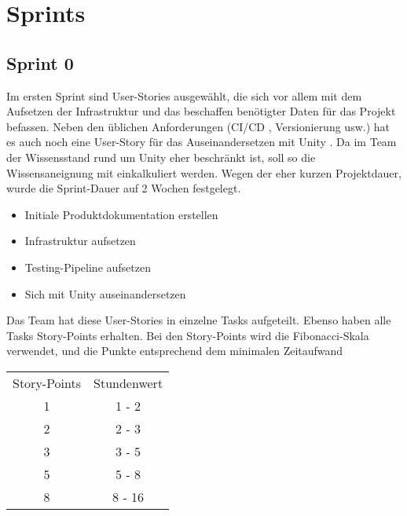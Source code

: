 \documentclass[../main.tex]{subfiles}
\begin{document}
	\section{Sprints}
	\label{section:Sprint 0}
	\subsection{Sprint 0}
	
	\par Im ersten Sprint sind User-Stories  ausgewählt, die sich vor allem mit dem Aufsetzen der Infrastruktur und das beschaffen benötigter Daten für das Projekt befassen. Neben den üblichen Anforderungen (CI/CD , Versionierung  usw.) hat es auch noch eine User-Story für das Auseinandersetzen mit Unity . Da im Team der Wissensstand rund um Unity eher beschränkt ist, soll so die Wissensaneignung mit einkalkuliert werden. Wegen der eher kurzen Projektdauer, wurde die Sprint-Dauer auf 2 Wochen festgelegt.
	
	\begin{itemize}
		\item Initiale Produktdokumentation erstellen
		\item Infrastruktur aufsetzen
		\item Testing-Pipeline aufsetzen
		\item Sich mit Unity auseinandersetzen
	\end{itemize} 

	\par Das Team hat diese User-Stories in einzelne Tasks aufgeteilt. Ebenso haben alle Tasks Story-Points erhalten. Bei den Story-Points wird die Fibonacci-Skala verwendet, und die Punkte entsprechend dem minimalen Zeitaufwand
	
	\begin{center}
		 \begin{tabular}{c | c} 
			\hline
			Story-Points & Stundenwert \\ [0.5ex] 
			1 & 1 - 2 \\ [1ex] 
			2 & 2 - 3 \\ [1ex]
			3 & 3 - 5 \\ [1ex]
			5 & 5 - 8 \\ [1ex]
			8 & 8 - 16\\ [1ex] 
			\hline
		\end{tabular}
	\end{center}
\end{document}
